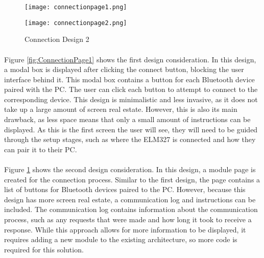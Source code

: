 		\begin{figure}[h]
			\begin{center}								
				\begin{minipage}{0.49\textwidth}
					\texttt{[image: connectionpage1.png]}
					\caption{Connection Design 1}						
					\label{fig:ConnectionPage1}
				\end{minipage}
				\hfill			
				\begin{minipage}{0.49\textwidth}
					\texttt{[image: connectionpage2.png]}
					\caption{Connection Design 2}						
					\label{fig:ConnectionPage2}
				\end{minipage}									
			\end{center}
		\end{figure}
		
		\paragraph{}{
		Figure \ref{fig:ConnectionPage1} shows the first design consideration. In this design, a modal box is displayed after clicking the connect button, blocking the user interface behind it. This modal box contains a button for each Bluetooth device paired with the PC. The user can click each button to attempt to connect to the corresponding device. This design is minimalistic and less invasive, as it does not take up a large amount of screen real estate. However, this is also its main drawback, as less space means that only a small amount of instructions can be displayed. As this is the first screen the user will see, they will need to be guided through the setup stages, such as where the ELM327 is connected and how they can pair it to their PC.
		}
		
		\paragraph{}{
		Figure \ref{fig:ConnectionPage2} shows the second design consideration. In this design, a module page is created for the connection process. Similar to the first design, the page contains a list of buttons for Bluetooth devices paired to the PC. However, because this design has more screen real estate, a communication log and instructions can be included. The communication log contains information about the communication process, such as any requests that were made and how long it took to receive a response. While this approach allows for more information to be displayed, it requires adding a new module to the existing architecture, so more code is required for this solution.
		}
		
